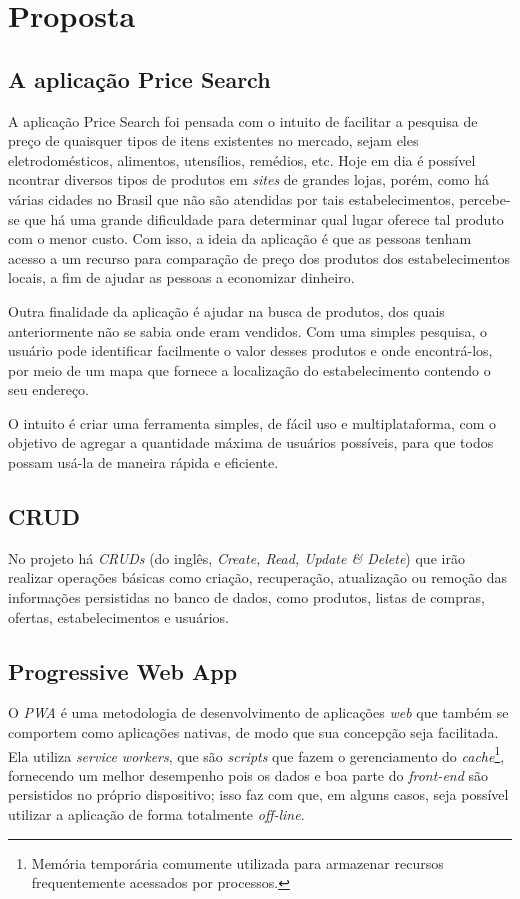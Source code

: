 \section{Proposta}
\label{sec:proposta}

\subsection{A aplicação Price Search}

A aplicação Price Search foi pensada com o intuito de facilitar a pesquisa de preço de quaisquer tipos de itens existentes no mercado, sejam eles eletrodomésticos, alimentos, utensílios, remédios, etc. Hoje em dia é possível ncontrar diversos tipos de produtos em \textit{sites} de grandes lojas, porém, como há várias cidades no Brasil que não são atendidas por tais estabelecimentos, percebe-se que há uma grande dificuldade para determinar qual lugar oferece tal produto com o menor custo. Com isso, a ideia da aplicação é que as pessoas tenham acesso a um recurso para comparação de preço dos produtos dos estabelecimentos locais, a fim de ajudar as pessoas a economizar dinheiro. 

Outra finalidade da aplicação é ajudar na busca de produtos, dos quais anteriormente não se sabia onde eram vendidos. Com uma simples pesquisa, o usuário pode identificar facilmente o valor desses produtos e onde encontrá-los, por meio de um mapa que fornece a localização do estabelecimento contendo o seu endereço. 

O intuito é criar uma ferramenta simples, de fácil uso e multiplataforma, com o objetivo de agregar a quantidade máxima de usuários possíveis, para que todos possam usá-la de maneira rápida e eficiente.

\subsection{CRUD}
No projeto há \textit{CRUDs} (do inglês, \textit{Create, Read, Update \& Delete}) que irão realizar operações básicas como criação, recuperação, atualização ou remoção das informações persistidas no banco de dados, como produtos, listas de compras, ofertas, estabelecimentos e usuários. 

\subsection{Progressive Web App}

O \textit{PWA} é uma metodologia de desenvolvimento de aplicações \textit{web} que também se comportem como aplicações nativas, de modo que sua concepção seja facilitada. Ela utiliza \textit{service workers}, que são \textit{scripts} que fazem o gerenciamento do \textit{cache}\footnote{Memória temporária comumente utilizada para armazenar recursos frequentemente acessados por processos.}, fornecendo um melhor desempenho pois os dados e boa parte do \textit{front-end} são persistidos no próprio dispositivo; isso faz com que, em alguns casos, seja possível utilizar a aplicação de forma totalmente \textit{off-line}.

